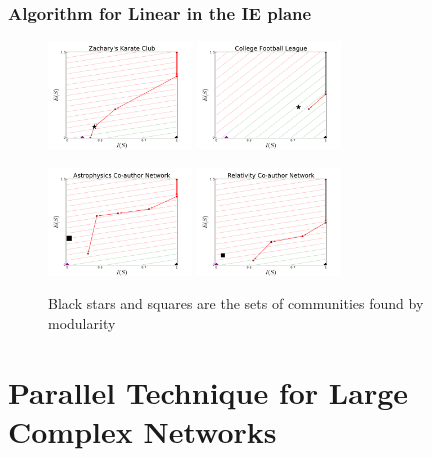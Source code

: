 \documentclass{beamer}
\begin{document}
\begin{frame}\frametitle{Algorithm for Linear in the IE plane}

\begin{figure}
\includegraphics[width=1.5in]{Figures/linear_sets_karate}
\includegraphics[width=1.5in]{Figures/linear_sets_cfl}

\includegraphics[width=1.5in]{Figures/linear_sets_astro}
\includegraphics[width=1.5in]{Figures/linear_sets_relativity}
\caption{Black stars and squares are the sets of communities found by modularity}
\end{figure}
\end{frame}


\section{Parallel Technique for Large Complex Networks}
\end{document}
